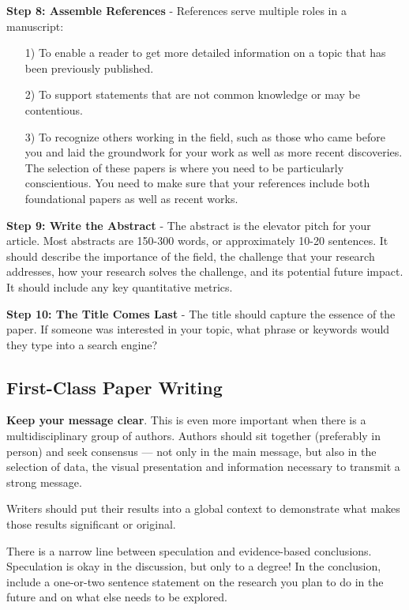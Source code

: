\textbf{Step 8: Assemble References} - References serve multiple roles in a manuscript:
\begin{itemize}
    \item[1)] To enable a reader to get more detailed information on a topic that has been previously published.
    \item[2)] To support statements that are not common knowledge or may be contentious.
    \item[3)] To recognize others working in the field, such as those who came before you and laid the groundwork for your work as well as more recent discoveries. The selection of these papers is where you need to be particularly conscientious. You need to make sure that your references include both foundational papers as well as recent works.
\end{itemize}


\textbf{Step 9: Write the Abstract} - The abstract is the elevator pitch for your article. Most abstracts are 150-300 words, or approximately 10-20 sentences. It should describe the importance of the field, the challenge that your research addresses, how your research solves the challenge, and its potential future impact. It should include any key quantitative metrics.


\textbf{Step 10: The Title Comes Last} - The title should capture the essence of the paper.  If someone was interested in your topic, what phrase or keywords would they type into a search engine?


\subsection{First-Class Paper Writing}

\textbf{Keep your message clear}. This is even more important when there is a multidisciplinary group of authors. Authors should sit together (preferably in person) and seek consensus --- not only in the main message, but also in the selection of data, the visual presentation and information necessary to transmit a strong message.


Writers should put their results into a global context to demonstrate what makes those results significant or original. 

There is a narrow line between speculation and evidence-based conclusions. Speculation is okay in the discussion, but only to a degree! In the conclusion, include a one-or-two sentence statement on the research you plan to do in the future and on what else needs to be explored.


